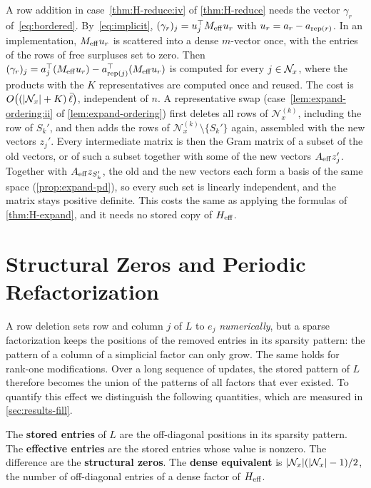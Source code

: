 A row addition in case~\ref{thm:H-reduce:iv} of \cref{thm:H-reduce} needs the vector $\gamma_r$ of~\eqref{eq:bordered}.
By~\eqref{eq:implicit}, $(\gamma_r)_j = u_j^\top M_{\mathrm{eff}} u_r$ with $u_r = a_r - a_{\operatorname{rep}(r)}$. In an
implementation, $M_{\mathrm{eff}} u_r$ is scattered into a dense $m$-vector once, with the entries of the
rows of free surpluses set to zero. Then $(\gamma_r)_j = a_j^\top(M_{\mathrm{eff}} u_r) - a_{\operatorname{rep}(j)}^\top(M_{\mathrm{eff}} u_r)$
is computed for every $j\in\mathcal{N}_x$, where the products with the $K$ representatives are computed once and reused. The
cost is $O\bigl((|\mathcal{N}_x| + K)\,\bar\ell\bigr)$, independent of $n$. A representative swap
(case~\ref{lem:expand-ordering:ii} of \cref{lem:expand-ordering}) first deletes all rows of $\mathcal{N}_x^{(k)}$, including the
row of $S_k'$, and then adds the rows of $\mathcal{N}_x^{(k)}\setminus\{S_k'\}$ again, assembled with
the new vectors $z_j'$. Every intermediate matrix is then the Gram matrix of a subset of the old
vectors, or of such a subset together with some of the new vectors $A_{\mathrm{eff}} z_j'$. Together with
$A_{\mathrm{eff}} z_{S_k'}$, the old and the new vectors each form a basis of the same space
(\cref{prop:expand-pd}), so every such set is linearly independent, and the matrix stays
positive definite.
This costs the same as applying the formulas of \cref{thm:H-expand}, and it needs no stored copy
of $H_{\mathrm{eff}}$.


\section{Structural Zeros and Periodic Refactorization}
\label{sec:refactorization}

A row deletion sets row and column $j$ of $L$ to $e_j$ \emph{numerically}, but a sparse
factorization keeps the positions of the removed entries in its sparsity pattern: the
pattern of a column of a simplicial factor can only grow. The same holds for rank-one
modifications. Over a long sequence of updates, the stored pattern of $L$ therefore becomes
the union of the patterns of all factors that ever existed. To quantify this effect we
distinguish the following quantities, which are measured in \cref{sec:results-fill}.

\begin{definition} \label{def:stored-effective}
The \textbf{stored entries} of $L$ are the off-diagonal positions in its sparsity pattern.
The \textbf{effective entries} are the stored entries whose value is nonzero. The difference
are the \textbf{structural zeros}. The \textbf{dense equivalent} is $|\mathcal{N}_x|(|\mathcal{N}_x|-1)/2$, the
number of off-diagonal entries of a dense factor of $H_{\mathrm{eff}}$.
\end{definition}

